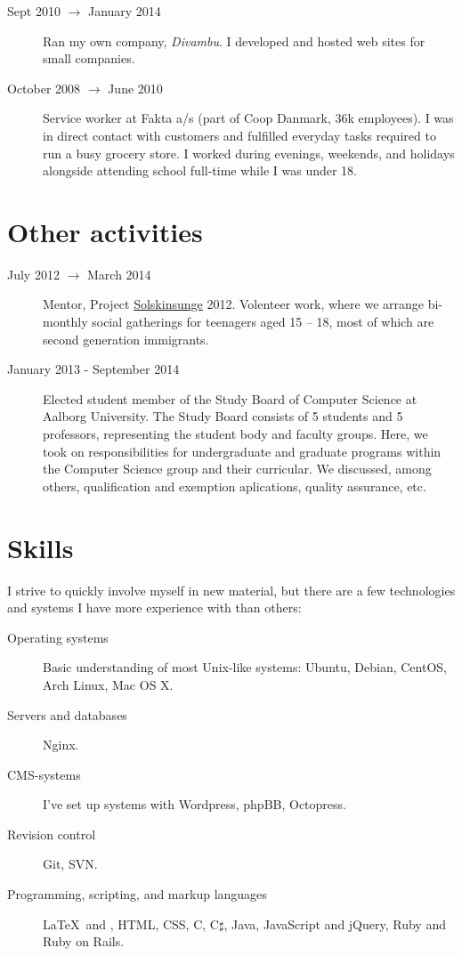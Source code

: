 \documentclass[margin,line]{resume}
\begin{document}
\begin{resume}
\begin{description}
  \item[Sept 2010 $\rightarrow$ January 2014] Ran my own company,
  \emph{Divambu}. I developed and hosted web sites for small companies.

  \item[October 2008 $\rightarrow$ June 2010] Service worker at Fakta
  a/s (part of Coop Danmark, 36k employees). I was in direct contact
  with customers and fulfilled everyday tasks required to run a busy
  grocery store. I worked during evenings, weekends, and holidays
  alongside attending school full-time while I was under 18.
\end{description}

\section{\mysidestyle Other activities}\vspace{1mm}
\begin{description}
  \item[July 2012 $\rightarrow$ March 2014] Mentor, Project
    \href{http://www.urk.dk/solskinsunge/}{Solskinsunge} 2012. Volenteer
    work, where we arrange bi-monthly social gatherings for teenagers aged
    15 -- 18, most of which are second generation immigrants.

  \item[January 2013 - September 2014] Elected student member of the
  Study Board of Computer Science at Aalborg University. The Study Board
  consists of 5 students and 5 professors, representing the student body
  and faculty groups. Here, we took on responsibilities
  for undergraduate and graduate programs within the Computer Science
  group and their curricular. We discussed, among others, qualification
  and exemption aplications, quality assurance, etc.
\end{description}

\section{\mysidestyle Skills} \vspace{1mm}
I strive to quickly involve myself in new material, but there are a few
technologies and systems I have more experience with than others:
\vspace{0.5cm}
\begin{description}
  \item[Operating systems] Basic understanding of most Unix-like
    systems: Ubuntu, Debian, CentOS, Arch Linux, Mac OS X.
  \item[Servers and databases] Nginx. 
  \item[CMS-systems] I've set up systems with Wordpress, phpBB,
    Octopress.
  \item[Revision control] Git, SVN.
  \item[Programming, scripting, and markup languages] \LaTeX\ and
    \XeTeX, HTML, CSS, C, C$\sharp$, Java, JavaScript and jQuery, Ruby
    and Ruby on Rails.
\end{description}


\end{resume}
\end{document}
